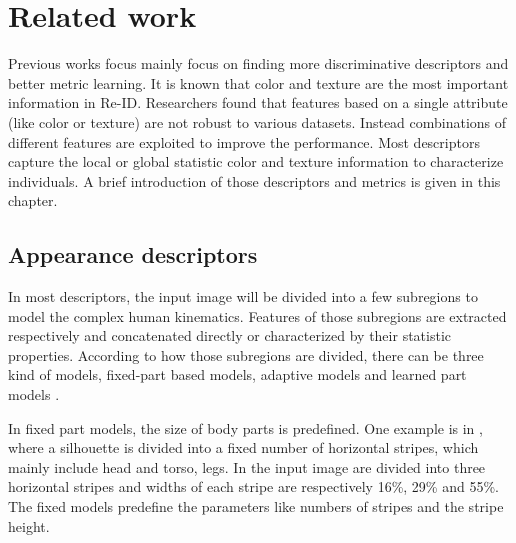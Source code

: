 \chapter{Related work}
Previous works focus mainly focus on finding more discriminative descriptors and better metric learning. It is known that color and texture are the most important information in Re-ID. Researchers found that features based on a single attribute (like color or texture) are not robust to various datasets. Instead combinations of different features are exploited to improve the performance. Most descriptors capture the local or global statistic color and texture information to characterize individuals. A brief introduction of those descriptors and metrics is given in this chapter.

\section{Appearance descriptors}
In most descriptors, the input image will be divided into a few subregions to model the complex human kinematics. Features of those subregions are extracted respectively and concatenated directly or characterized by their statistic properties. According to how those subregions are divided, there can be three kind of models, fixed-part based models, adaptive models and learned part models \cite{Appearancedesc}. 

In fixed part models, the size of body parts is predefined. One example is in \cite{ImportantFeatures, PRDC, REIDSVM}, where a silhouette is divided into a fixed number of horizontal stripes, which mainly include head and torso, legs. In \cite{AppBasedREID} the input image are divided into three horizontal stripes and widths of each stripe are respectively 16\%, 29\% and 55\%.  The fixed models predefine the parameters like numbers of stripes and the stripe height. 

